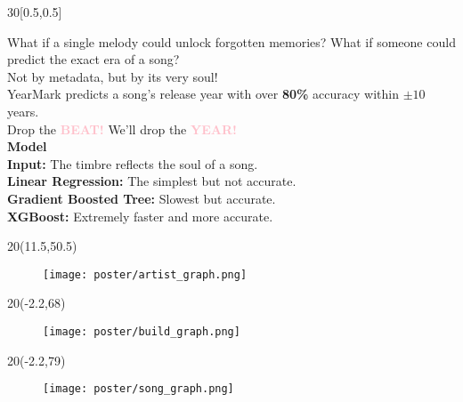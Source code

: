 \documentclass{beamer}
\begin{document}
\begin{textblock}{30}[0.5,0.5]
\begin{basebox}[frame hidden, interior hidden, halign=center, valign=center]
\begin{minipage}{0.85\linewidth}
      {\large What if a single melody could unlock forgotten memories? What if someone could predict the exact era of a song? \\ Not by metadata, but by its very soul!}\\[0.5em]
      {\large YearMark predicts a song's release year with over \textbf{80\%} accuracy within \(\pm10\) years.}\\[0.8em]
      {\large Drop the \Large \textcolor{pink}{\textbf{BEAT!}} \large We'll drop the \Large \textcolor{pink}{\textbf{YEAR!}}}\\[0.8em]
      {\large\textbf{Model}}\\
      {\normalsize
          \textbf{Input:} The timbre reflects the soul of a song.\\
          \textbf{Linear Regression:} The simplest but not accurate.\\
          \textbf{Gradient Boosted Tree:} Slowest but accurate.\\
          \textbf{XGBoost:} Extremely faster and more accurate.\\
      }
    \end{minipage}

    \vspace{2cm}
  \end{basebox}
\end{textblock}



\begin{textblock}{20}(11.5,50.5)
\begin{figure}
    \centering
    \texttt{[image: poster/artist\_graph.png]}
\end{figure}
    
\end{textblock}

\begin{textblock}{20}(-2.2,68)

\begin{figure}
    \centering
    \texttt{[image: poster/build\_graph.png]}
\end{figure}
    
\end{textblock}

\begin{textblock}{20}(-2.2,79)
\begin{figure}
    \centering
    \texttt{[image: poster/song\_graph.png]}
\end{figure}
    
\end{textblock}
\end{document}
